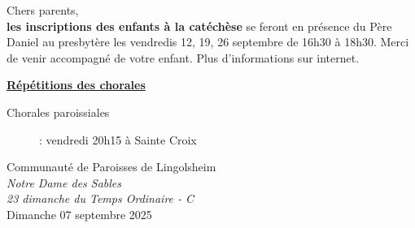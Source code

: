 \documentclass[french,11pt]{article}
\newcommand{\JournalName}[1]{%
		\begin{center}
            \Large \usefont{T1}{augie}{m}{n}
			#1%
		\end{center}
		\par \normalsize \normalfont}
\newcommand*{\footer}{..}
\newcommand{\NewsItem}[1]{%
\vspace{3pt}
\underline{\textbf{#1}}
		  }
\begin{document}
\begin{framed}
Chers parents,\\
\textbf{les inscriptions des enfants à la catéchèse} se feront en présence du Père Daniel au presbytère
les vendredis 12, 19, 26 septembre de 16h30 à 18h30. Merci de venir accompagné de votre enfant.
Plus d'informations sur internet.
\end{framed}

\NewsItem{Répétitions des chorales}
\begin{description}
\item[Chorales paroissiales] : vendredi 20h15 à Sainte Croix
\end{description}



\newpage

\JournalName{Communauté de Paroisses de Lingolsheim \\
\normalsize \textit{Notre Dame des Sables}
\\  \normalsize \textit{23\ieme{} dimanche du Temps Ordinaire - C}
\\ \large Dimanche 07 septembre 2025}


\begin{minipage}[h]{1.0\linewidth}
\setlength{\parindent}{1em}

\end{minipage}
\end{document}
